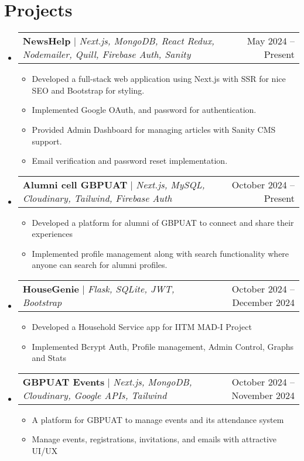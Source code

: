 \documentclass[letterpaper,11pt]{article}
\makeatletter
\newcommand{\resumeItem}[1]{
  \item\small{
    {#1 \vspace{-2pt}}
  }
}
\newcommand{\resumeProjectHeading}[2]{
    \item
    \begin{tabular*}{0.97\textwidth}{l@{\extracolsep{\fill}}r}
      \small#1 & #2 \\
    \end{tabular*}\vspace{-7pt}
}
\newcommand{\resumeSubHeadingListStart}{\begin{itemize}[leftmargin=0.15in, label={}]}
\newcommand{\resumeSubHeadingListEnd}{\end{itemize}}
\newcommand{\resumeItemListStart}{\begin{itemize}}
\newcommand{\resumeItemListEnd}{\end{itemize}\vspace{-5pt}}
\makeatother
\begin{document}
\section{Projects}
    \resumeSubHeadingListStart
      \resumeProjectHeading
          {\textbf{NewsHelp} $|$ \emph{Next.js, MongoDB, React Redux, Nodemailer, Quill, Firebase Auth, Sanity}}{May 2024 -- Present}
          \resumeItemListStart
            \resumeItem{Developed a full-stack web application using Next.js with SSR for nice SEO and Bootstrap for styling.}
            \resumeItem{Implemented Google OAuth, and password for authentication.}
            \resumeItem{Provided Admin Dashboard for managing articles with Sanity CMS support.}
            \resumeItem{Email verification and password reset implementation.}
          \resumeItemListEnd
      \resumeProjectHeading
          {\textbf{Alumni cell GBPUAT} $|$ \emph{Next.js, MySQL, Cloudinary, Tailwind, Firebase Auth}}{October 2024 -- Present}
          \resumeItemListStart
            \resumeItem{Developed a platform for alumni of GBPUAT to connect and share their experiences}
            \resumeItem{Implemented profile management along with search functionality where anyone can search for alumni profiles.}
          \resumeItemListEnd
      \resumeProjectHeading
          {\textbf{HouseGenie} $|$ \emph{Flask, SQLite, JWT, Bootstrap}}{October 2024 -- December 2024}
          \resumeItemListStart
            \resumeItem{Developed a Household Service app for IITM MAD-I Project}
            \resumeItem{Implemented Bcrypt Auth, Profile management, Admin Control, Graphs and Stats}
          \resumeItemListEnd
      \resumeProjectHeading
          {\textbf{GBPUAT Events} $|$ \emph{ Next.js, MongoDB, Cloudinary, Google APIs, Tailwind}}{October 2024 -- November 2024}
          \resumeItemListStart
            \resumeItem{A platform for GBPUAT to manage events and its attendance system}
            \resumeItem{Manage events, registrations, invitations, and emails with attractive UI/UX}
          \resumeItemListEnd
    \resumeSubHeadingListEnd



%
\end{document}
